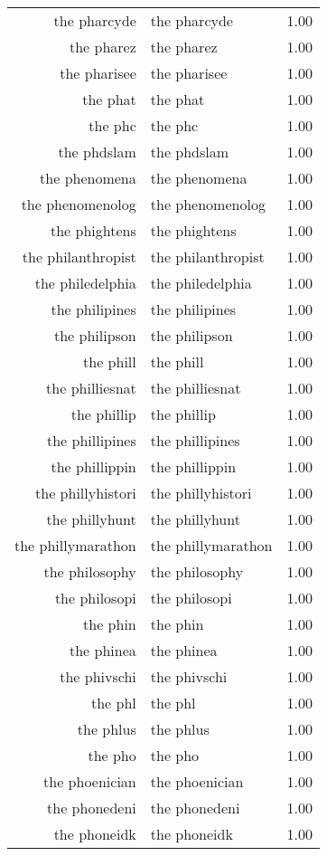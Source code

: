 \begin{table}[ht]
\begin{tabular}{rlr}
  the pharcyde & the pharcyde & 1.00 \\ 
  the pharez & the pharez & 1.00 \\ 
  the pharisee & the pharisee & 1.00 \\ 
  the phat & the phat & 1.00 \\ 
  the phc & the phc & 1.00 \\ 
  the phdslam & the phdslam & 1.00 \\ 
  the phenomena & the phenomena & 1.00 \\ 
  the phenomenolog & the phenomenolog & 1.00 \\ 
  the phightens & the phightens & 1.00 \\ 
  the philanthropist & the philanthropist & 1.00 \\ 
  the philedelphia & the philedelphia & 1.00 \\ 
  the philipines & the philipines & 1.00 \\ 
  the philipson & the philipson & 1.00 \\ 
  the phill & the phill & 1.00 \\ 
  the philliesnat & the philliesnat & 1.00 \\ 
  the phillip & the phillip & 1.00 \\ 
  the phillipines & the phillipines & 1.00 \\ 
  the phillippin & the phillippin & 1.00 \\ 
  the phillyhistori & the phillyhistori & 1.00 \\ 
  the phillyhunt & the phillyhunt & 1.00 \\ 
  the phillymarathon & the phillymarathon & 1.00 \\ 
  the philosophy & the philosophy & 1.00 \\ 
  the philosopi & the philosopi & 1.00 \\ 
  the phin & the phin & 1.00 \\ 
  the phinea & the phinea & 1.00 \\ 
  the phivschi & the phivschi & 1.00 \\ 
  the phl & the phl & 1.00 \\ 
  the phlus & the phlus & 1.00 \\ 
  the pho & the pho & 1.00 \\ 
  the phoenician & the phoenician & 1.00 \\ 
  the phonedeni & the phonedeni & 1.00 \\ 
  the phoneidk & the phoneidk & 1.00 \\ 

\end{tabular}
\end{table}
